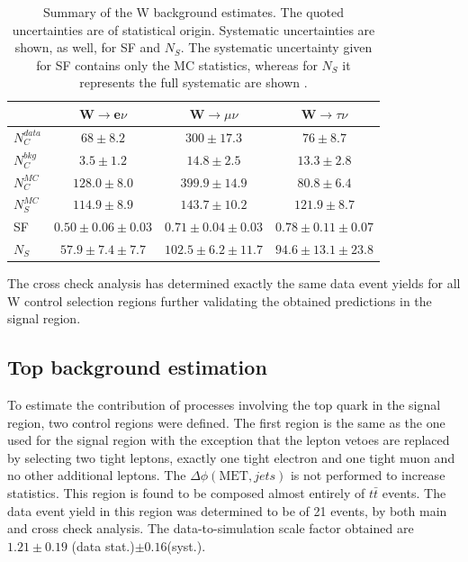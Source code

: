 \begin{table}[!htb]
\centering
\begin{tabular}{|l|c|c|c|}
\hline
 & W$\rightarrow$e$\nu$ & W$\rightarrow\mu\nu$ & W$\rightarrow\tau\nu$ \\
\hline\hline
$N_{C}^{data}$ &    $68\pm8.2$ &   $300\pm17.3$ &    $76\pm8.7$ \\
$N_{C}^{bkg}$  &   $3.5\pm1.2$ &  $14.8\pm2.5$  &  $13.3\pm2.8$ \\
$N_{C}^{MC}$   & $128.0\pm8.0$ & $399.9\pm14.9$ &  $80.8\pm6.4$ \\
$N_{S}^{MC}$   & $114.9\pm8.9$ & $143.7\pm10.2$ & $121.9\pm8.7$ \\
\hline\hline
SF             & $0.50\pm0.06\pm0.03$ & $0.71\pm0.04\pm0.03$ & $0.78\pm0.11\pm0.07$ \\
\hline\hline
$N_{S}$        & $57.9\pm7.4\pm7.7$ & $102.5\pm6.2\pm11.7$ & $94.6\pm13.1\pm23.8$ \\
\hline
\end{tabular}
\caption{Summary of the W background estimates. The quoted uncertainties are of statistical origin. Systematic uncertainties are shown, as well, for SF and $N_S$. The systematic uncertainty given for SF contains only the \gls{MC} statistics, whereas for $N_{S}$ it represents the full systematic are shown \cite{ARTICLE:CMSVBFHiggsInvisibleParkedAnalysisPAS}.}
\label{TABLE:ParkedDataAnalysis_WBackground_Summary}
\end{table}

The cross check analysis has determined exactly the same data event yields for all W control selection regions further validating the obtained predictions in the signal region.

\clearpage

\subsection{Top background estimation}
\label{SECTION:ParkedDataAnalysis_ControlRegions_TopBackground}


To estimate the contribution of processes involving the top quark in the signal region, two control regions were defined. The first region is the same as the one used for the signal region with the exception that the lepton vetoes are replaced by selecting two tight leptons, exactly one tight electron and one tight muon and no other additional leptons. The $\Delta\phi(\text{MET},jets)$ is not performed to increase statistics.  This region is found to be composed almost entirely of $t\bar{t}$ events. The data event yield in this region was determined to be of 21 events, by both main and cross check analysis. The data-to-simulation scale factor obtained are $1.21\pm 0.19$ (data stat.)$ \pm 0.16 $(syst.).

